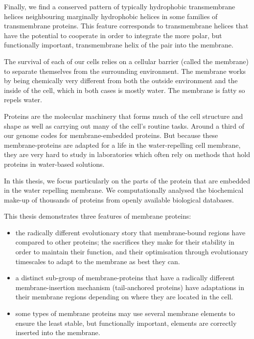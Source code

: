 \documentclass[12pt,PhD,twoside]{muthesis}
\begin{document}
Finally, we find a conserved pattern of typically hydrophobic transmembrane helices neighbouring marginally hydrophobic helices in some families of transmembrane proteins.
This feature corresponds to transmembrane helices that have the potential to cooperate in order to integrate the more polar, but functionally important, transmembrane helix of the pair into the membrane.



The survival of each of our cells relies on a cellular barrier (called the membrane) to separate themselves from the surrounding environment.
The membrane works by being chemically very different from both the outside environment and the inside of the cell, which in both cases is mostly water.
The membrane is fatty so repels water.

Proteins are the molecular machinery that forms much of the cell structure and shape as well as carrying out many of the cell's routine tasks.
Around a third of our genome codes for membrane\--embedded proteins.
But because these membrane\--proteins are adapted for a life in the water\--repelling cell membrane, they are very hard to study in laboratories which often rely on methods that hold proteins in water\--based solutions.

In this thesis, we focus particularly on the parts of the protein that are embedded in the water repelling membrane.
We computationally analysed the biochemical make\--up of thousands of proteins from openly available biological databases.

This thesis demonstrates three features of membrane proteins:
\begin{itemize}

  \item the radically different evolutionary story that membrane\--bound regions have compared to other proteins; the sacrifices they make for their stability in order to maintain their function, and their optimisation through evolutionary timescales to adapt to the membrane as best they can.

  \item a distinct sub\--group of membrane\--proteins that have a radically different membrane\--insertion mechanism (tail\--anchored proteins) have adaptations in their membrane regions depending on where they are located in the cell.

  \item some types of membrane proteins may use several membrane elements to ensure the least stable, but functionally important, elements are correctly inserted into the membrane.

\end{itemize}
\end{document}
